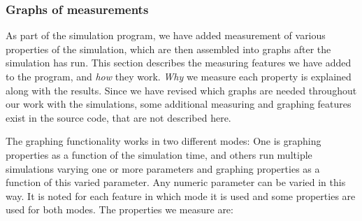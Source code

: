 \subsubsection{Graphs of measurements}
As part of the simulation program, we have added measurement of various 
properties of the simulation, which are then assembled into graphs after the 
simulation has run. This section describes the measuring features we have 
added to the program, and \emph{how} they work. \emph{Why} we measure each 
property is explained along with the results. Since we have revised which 
graphs are needed throughout our work with the simulations, some additional 
measuring and graphing features exist in the source code, that are not 
described here.

The graphing functionality works in two different modes: One is graphing 
properties as a function of the simulation time, and others run multiple 
simulations varying one or more parameters and graphing properties as a 
function of this varied parameter. Any numeric parameter can be varied in this 
way. It is noted for each feature in which mode it is used and some properties 
are used for both modes. The properties we measure are:


